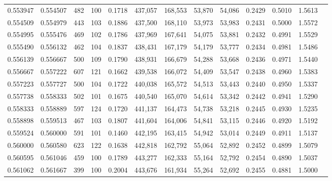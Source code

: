 \begin{tabular}{rrrrrrrrrrrrr}
0.553947 & 0.554507 &    482 &   100 &                                     0.1718 & 437,057 & 168,553 &  53,870 &  54,086 & 0.2429 & 0.5010 & 1.5613 \\
0.554509 & 0.554979 &    443 &   103 &                                     0.1886 & 437,500 & 168,110 &  53,973 &  53,983 & 0.2431 & 0.5000 & 1.5572 \\
0.554995 & 0.555476 &    469 &   102 &                                     0.1786 & 437,969 & 167,641 &  54,075 &  53,881 & 0.2432 & 0.4991 & 1.5529 \\
0.555490 & 0.556132 &    462 &   104 &                                     0.1837 & 438,431 & 167,179 &  54,179 &  53,777 & 0.2434 & 0.4981 & 1.5486 \\
0.556139 & 0.556667 &    500 &   109 &                                     0.1790 & 438,931 & 166,679 &  54,288 &  53,668 & 0.2436 & 0.4971 & 1.5440 \\
0.556667 & 0.557222 &    607 &   121 &                                     0.1662 & 439,538 & 166,072 &  54,409 &  53,547 & 0.2438 & 0.4960 & 1.5383 \\
0.557223 & 0.557727 &    500 &   104 &                                     0.1722 & 440,038 & 165,572 &  54,513 &  53,443 & 0.2440 & 0.4950 & 1.5337 \\
0.557738 & 0.558333 &    502 &   101 &                                     0.1675 & 440,540 & 165,070 &  54,614 &  53,342 & 0.2442 & 0.4941 & 1.5290 \\
0.558333 & 0.558889 &    597 &   124 &                                     0.1720 & 441,137 & 164,473 &  54,738 &  53,218 & 0.2445 & 0.4930 & 1.5235 \\
0.558898 & 0.559513 &    467 &   103 &                                     0.1807 & 441,604 & 164,006 &  54,841 &  53,115 & 0.2446 & 0.4920 & 1.5192 \\
0.559524 & 0.560000 &    591 &   101 &                                     0.1460 & 442,195 & 163,415 &  54,942 &  53,014 & 0.2449 & 0.4911 & 1.5137 \\
0.560000 & 0.560580 &    623 &   122 &                                     0.1638 & 442,818 & 162,792 &  55,064 &  52,892 & 0.2452 & 0.4899 & 1.5079 \\
0.560595 & 0.561046 &    459 &   100 &                                     0.1789 & 443,277 & 162,333 &  55,164 &  52,792 & 0.2454 & 0.4890 & 1.5037 \\
0.561062 & 0.561667 &    399 &   100 &                                     0.2004 & 443,676 & 161,934 &  55,264 &  52,692 & 0.2455 & 0.4881 & 1.5000 \\

\end{tabular}
